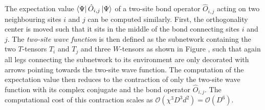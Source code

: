 The expectation value $\bra{\Psi}\hat{O}_{i,j}\ket{\Psi}$ of a two-site bond operator $\hat{O}_{i,j}$ acting on two neighbouring sites $i$ and $j$ can be computed similarly. First, the orthogonality center is moved such that it sits in the middle of the bond connecting sites $i$ and $j$. The \textit{two-site wave function} is then defined as the subnetwork containing the two $T$-tensors $T_i$ and $T_j$ and three $W$-tensors as shown in Figure , such that again all legs connecting the subnetwork to its environment are only decorated with arrows pointing towards the two-site wave function. The computation of the expectation value then reduces to the contraction of only the two-site wave function with its complex conjugate and the bond operator $\hat{O}_{i,j}$. The computational cost of this contraction scales as $\mathcal{O}\left(\chi^3D^3d^2\right) = \mathcal{O}(D^6)$.